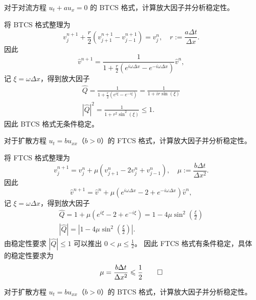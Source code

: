 \begin{example}\label{eg:btcs}
    对于对流方程 $u_t + a u_x = 0$ 的 BTCS 格式，计算放大因子并分析稳定性。
\end{example}

\begin{solution*}
    将 BTCS 格式整理为
    \[
        v_j^{n+1} + \frac{r}2 \left( v_{j+1}^{n+1} - v_{j-1}^{n+1} \right) = v_j^n, \quad r := \frac{a \Delta t}{\Delta x}.
    \]
    因此
    \[
        \hat{v}^{n+1} = \frac{1}{1 + \frac{r}2 (e^{i \omega \Delta x} - e^{-i \omega \Delta x})} \hat{v}^n,
    \]
    记 $\xi = \omega \Delta x$，得到放大因子
    \begin{gather*}
        \widehat{Q} ={} \frac{1}{1 + \frac{r}2 (e^{i \xi} - e^{-i \xi})} = \frac{1}{1 + i r \sin(\xi)}            \\
        |\widehat{Q}|^2  ={} \frac{1}{1 + r^2 \sin^2(\xi)} \le 1.
    \end{gather*}
    因此 BTCS 格式无条件稳定。
\end{solution*}

\begin{example}
    对于扩散方程 $u_t = b u_{xx}$（$b>0$）的 FTCS 格式，计算放大因子并分析稳定性。
\end{example}

\begin{solution*}
    将 FTCS 格式整理为
    \[
        v_j^{n+1} = v_j^n + \mu \left( v_{j+1}^n - 2 v_j^n + v_{j-1}^n \right), \quad \mu := \frac{b \Delta t}{\Delta x^2}.
    \]
    因此
    \[
        \hat{v}^{n+1} = \hat{v}^n + \mu (e^{i \omega \Delta x} - 2 + e^{- i \omega \Delta x}) \hat{v}^n,
    \]
    记 $\xi = \omega \Delta x$，得到放大因子
    \begin{gather*}
        \widehat{Q} ={} 1 + \mu (e^{i \xi} - 2 + e^{- i \xi}) =  1 - 4 \mu \sin^2(\frac{\xi}2) \\
        |\widehat{Q}| ={} \left|1 - 4 \mu \sin^2(\frac{\xi}2)\right|.
    \end{gather*}
    由稳定性要求 $|\widehat{Q}| \le 1$ 可以推出 $0 < \mu \le \frac12$。
    因此 FTCS 格式有条件稳定，具体的稳定性要求为
    \[
        \mu = \frac{b \Delta t}{\Delta x^2} \le \frac12 \qedhere
    \]
\end{solution*}

\begin{example}
    对于扩散方程 $u_t = b u_{xx}$（$b>0$）的 BTCS 格式，计算放大因子并分析稳定性。
\end{example}

